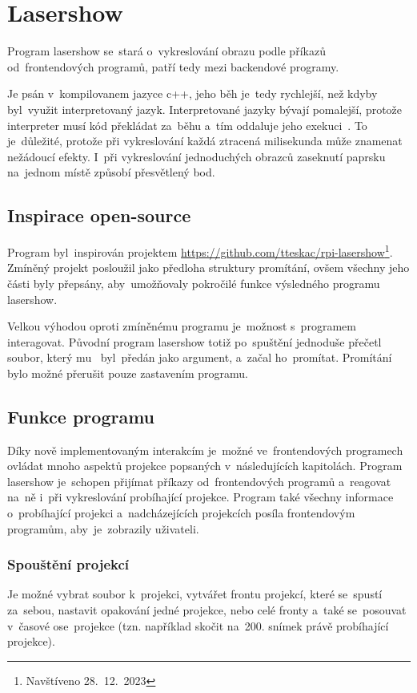 \section{Lasershow}
Program lasershow se~stará o~vykreslování obrazu podle příkazů od~frontendových programů, patří tedy mezi backendové programy.

Je psán v~kompilovanem jazyce c++, jeho běh je~tedy rychlejší, než kdyby byl~využit interpretovaný jazyk.
Interpretované jazyky bývají pomalejší, protože interpreter musí kód překládat za~běhu a~tím oddaluje jeho exekuci~\cite{interpret}.
To je~důležité, protože při vykreslování každá ztracená milisekunda může znamenat nežádoucí efekty. I~při vykreslování jednoduchých obrazců zaseknutí paprsku na~jednom místě způsobí přesvětlený bod.

\subsection{Inspirace open-source}
Program byl~inspirován projektem \url{https://github.com/tteskac/rpi-lasershow}\footnote{Navštíveno 28.~12.~2023}. Zmíněný projekt posloužil jako předloha struktury promítání, ovšem všechny jeho části byly přepsány, aby~umožňovaly pokročilé funkce výsledného programu lasershow.

Velkou výhodou oproti zmíněnému programu je~možnost s~programem interagovat.
Původní program lasershow totiž po~spuštění jednoduše přečetl soubor, který mu ~byl~předán jako argument, a~začal ho~promítat. Promítání bylo možné přerušit pouze zastavením programu.

\subsection{Funkce programu}
Díky nově implementovaným interakcím je~možné ve~frontendových programech ovládat mnoho aspektů projekce popsaných v~následujících kapitolách. Program lasershow je~schopen přijímat příkazy od~frontendových programů a~reagovat na~ně i~při vykreslování probíhající projekce. Program také všechny informace o~probíhající projekci a~nadcházejících projekcích posíla frontendovým programům, aby~je~zobrazily uživateli.

\subsubsection{Spouštění projekcí}
Je možné vybrat soubor k~projekci, vytvářet frontu projekcí, které se~spustí za~sebou, nastavit opakování jedné projekce, nebo celé fronty a~také se~posouvat v~časové ose~projekce (tzn. například skočit na~200. snímek právě probíhající projekce).

